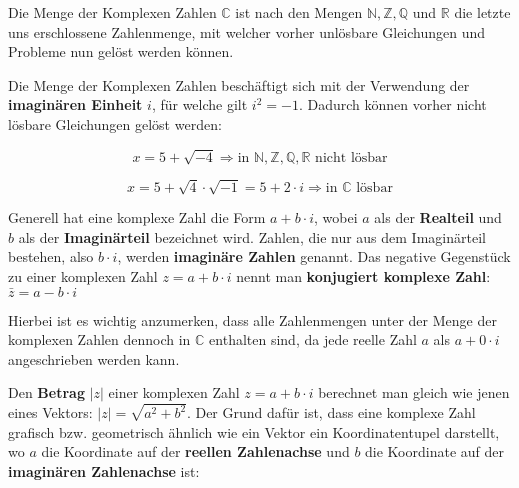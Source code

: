 



\thispagestyle{plain}


Die Menge der Komplexen Zahlen $\mathbb{C}$ ist nach den Mengen $\mathbb{N, Z, Q}$ und $\mathbb{R}$ die letzte uns erschlossene Zahlenmenge, mit welcher vorher unl\"{o}sbare Gleichungen und Probleme nun gel\"{o}st werden k\"{o}nnen.


Die Menge der Komplexen Zahlen besch\"{a}ftigt sich mit der Verwendung der \textbf{imagin\"{a}ren Einheit} $i$, f\"{u}r welche gilt $i^2 = -1$. Dadurch k\"{o}nnen vorher nicht l\"{o}sbare Gleichungen gel\"{o}st werden:

$$x = 5 + \sqrt{-4} \Rightarrow \text{in }\mathbb{N, Z, Q, R} \text{ nicht l\"{o}sbar}$$

$$x = 5 + \sqrt{4} \cdot \sqrt{-1} = 5 + 2 \cdot i \Rightarrow \text{in } \mathbb{C} \text{ l\"{o}sbar}$$

Generell hat eine komplexe Zahl die Form $a + b \cdot i$, wobei $a$ als der \textbf{Realteil} und $b$ als der \textbf{Imagin\"{a}rteil} bezeichnet wird. Zahlen, die nur aus dem Imagin\"{a}rteil bestehen, also $b \cdot i$, werden \textbf{imagin\"{a}re Zahlen} genannt. Das negative Gegenst\"{u}ck zu einer komplexen Zahl $z = a + b \cdot i$ nennt man \textbf{konjugiert komplexe Zahl}: $\bar{z} = a - b \cdot i$

Hierbei ist es wichtig anzumerken, dass alle Zahlenmengen unter der Menge der komplexen Zahlen dennoch in $\mathbb{C}$ enthalten sind, da jede reelle Zahl $a$ als $a + 0 \cdot i$ angeschrieben werden kann.

Den \textbf{Betrag} $|z|$ einer komplexen Zahl $z = a + b \cdot i$ berechnet man gleich wie jenen eines Vektors: $|z| = \sqrt{a^2 + b^2}$. Der Grund daf\"{u}r ist, dass eine komplexe Zahl grafisch bzw. geometrisch \"{a}hnlich wie ein Vektor ein Koordinatentupel darstellt, wo $a$ die Koordinate auf der \textbf{reellen Zahlenachse} und $b$ die Koordinate auf der \textbf{imagin\"{a}ren Zahlenachse} ist:

